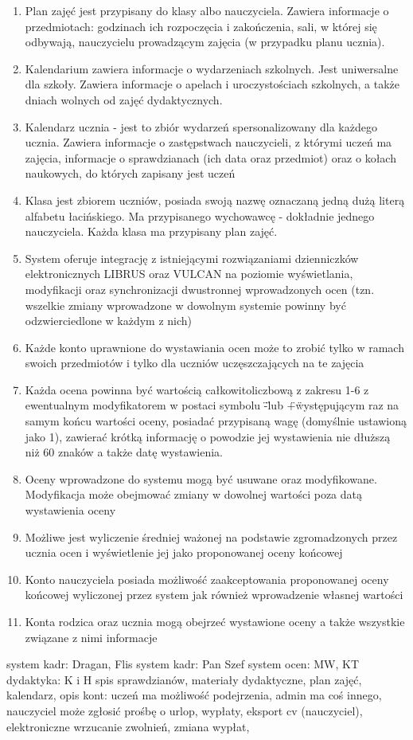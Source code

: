 \documentclass{article}
\begin{document}
\begin{enumerate}
    \item Plan zajęć jest przypisany do klasy albo nauczyciela. Zawiera informacje o przedmiotach: godzinach ich rozpoczęcia i zakończenia, sali, w której się odbywają, nauczycielu prowadzącym zajęcia (w przypadku planu ucznia).
    \item Kalendarium zawiera informacje o wydarzeniach szkolnych. Jest uniwersalne dla szkoły. Zawiera informacje o apelach i uroczystościach szkolnych, a także dniach wolnych od zajęć dydaktycznych.
    \item Kalendarz ucznia - jest to zbiór wydarzeń spersonalizowany dla każdego ucznia. Zawiera informacje o zastępstwach nauczycieli, z którymi uczeń ma zajęcia, informacje o sprawdzianach (ich data oraz przedmiot) oraz o kołach naukowych, do których zapisany jest uczeń
    \item Klasa jest zbiorem uczniów, posiada swoją nazwę oznaczaną jedną dużą literą alfabetu łacińskiego. Ma przypisanego wychowawcę - dokładnie jednego nauczyciela. Każda klasa ma przypisany plan zajęć.

    \item System oferuje integrację z istniejącymi rozwiązaniami dzienniczków elektronicznych LIBRUS oraz VULCAN na poziomie wyświetlania, modyfikacji oraz synchronizacji dwustronnej wprowadzonych ocen (tzn. wszelkie zmiany wprowadzone w dowolnym systemie powinny być odzwierciedlone w każdym z nich)
    \item Każde konto uprawnione do wystawiania ocen może to zrobić tylko w ramach swoich przedmiotów i tylko dla uczniów uczęszczających na te zajęcia
    \item Każda ocena powinna być wartością całkowitoliczbową z zakresu 1-6 z ewentualnym modyfikatorem w postaci symbolu \"-\" lub \"+\" występującym raz na samym końcu wartości oceny, posiadać przypisaną wagę (domyślnie ustawioną jako 1), zawierać krótką informację o powodzie jej wystawienia nie dłuższą niż 60 znaków a także datę wystawienia.
    \item Oceny wprowadzone do systemu mogą być usuwane oraz modyfikowane. Modyfikacja może obejmować zmiany w dowolnej wartości poza datą wystawienia oceny
    \item Możliwe jest wyliczenie średniej ważonej na podstawie zgromadzonych przez ucznia ocen i wyświetlenie jej jako proponowanej oceny końcowej
    \item Konto nauczyciela posiada możliwość zaakceptowania proponowanej oceny końcowej wyliczonej przez system jak również wprowadzenie własnej wartości
    \item Konta rodzica oraz ucznia mogą obejrzeć wystawione oceny a także wszystkie związane z nimi informacje
\end{enumerate}
system kadr: Dragan, Flis
system kadr: Pan Szef
system ocen: MW, KT
dydaktyka: K i H spis sprawdzianów, materiały dydaktyczne, plan zajęć, kalendarz, opis kont: uczeń ma możliwość podejrzenia, admin ma coś innego, nauczyciel może zgłosić prośbę o urlop, wypłaty, eksport cv (nauczyciel), elektroniczne wrzucanie zwolnień, zmiana wypłat,
\end{document}
